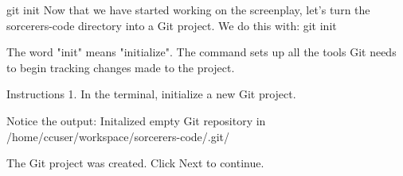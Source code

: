 git init
    Now that we have started working on the screenplay, let’s turn the sorcerers-code directory into a Git project. We do this with:
        git init

    The word "init" means "initialize". The command sets up all the tools Git needs to begin tracking changes made to the project.

Instructions
    1.
    In the terminal, initialize a new Git project.

    Notice the output:
        Initalized empty Git repository in /home/ccuser/workspace/sorcerers-code/.git/
        
    The Git project was created. Click Next to continue.